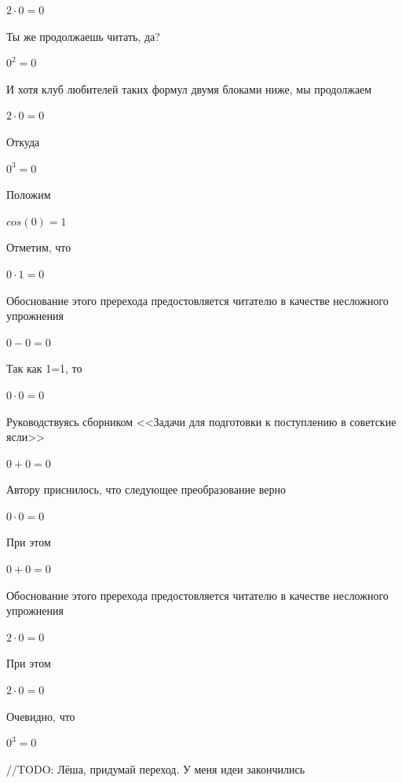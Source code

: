 \documentclass[12pt,a4paper,fleqn]{article}
\begin{document}
\begin{center}$2 \cdot 0 = 0$\end{center}
Ты же продолжаешь читать, да?

\begin{center}$0^{2} = 0$\end{center}
И хотя клуб любителей таких формул двумя блоками ниже, мы продолжаем

\begin{center}$2 \cdot 0 = 0$\end{center}
Откуда

\begin{center}$0^{3} = 0$\end{center}
Положим

\begin{center}$cos(0) = 1$\end{center}
Отметим, что

\begin{center}$0 \cdot 1 = 0$\end{center}
Обоснование этого пререхода предостовляется читателю в качестве несложного упрожнения

\begin{center}$0-0 = 0$\end{center}
Так как 1=1, то\cite{link4}

\begin{center}$0 \cdot 0 = 0$\end{center}
Руководствуясь сборником <<Задачи для подготовки к поступлению в советские ясли>>\cite{link1}

\begin{center}$0+0 = 0$\end{center}
Автору приснилось, что следующее преобразование верно

\begin{center}$0 \cdot 0 = 0$\end{center}
При этом

\begin{center}$0+0 = 0$\end{center}
Обоснование этого пререхода предостовляется читателю в качестве несложного упрожнения

\begin{center}$2 \cdot 0 = 0$\end{center}
При этом

\begin{center}$2 \cdot 0 = 0$\end{center}
Очевидно, что

\begin{center}$0^{3} = 0$\end{center}
//TODO: Лёша, придумай переход. У меня идеи закончились
\end{document}
